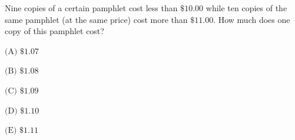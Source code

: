 

Nine copies of a certain pamphlet cost less than $\$ 10.00$ while ten copies of the same pamphlet (at the same price) cost more than $\$ 11.00$. How much does one copy of this pamphlet cost?

$\text{(A)}$ $\$1.07$

$\text{(B)}$ $\$1.08$

$\text{(C)}$ $\$1.09$

$\text{(D)}$ $\$1.10$

$\text{(E)}$ $\$1.11$
